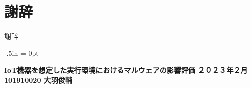 \documentclass[12pt,a4paper,titlepage,report]{jsbook}
\begin{document}



\newpage
\renewcommand{\bibname}{参考文献}


\chapter*{謝辞}
謝辞

\clearpage
\thispagestyle{empty}
\oddsidemargin -2.5in
\evensidemargin -2.5in
\topmargin -.5in
\marginparwidth = 0pt
{
	\tate
	\begin{minipage}{8.0in}
		\small
		\textbf{IoT機器を想定した実行環境におけるマルウェアの影響評価}
		\hfill
		\textbf{２０２３年２月}
		\hfill
		\textbf{101910020 大羽俊輔}
	\end{minipage}
}
\end{document}

